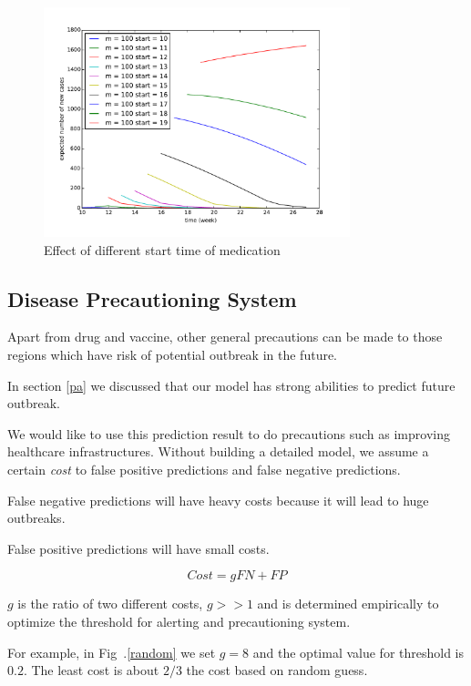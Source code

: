 \documentclass[11pt]{article}
\begin{document}
\begin{figure}[hbtp]
\begin{center}
  \includegraphics[width=3.5in]{graph/good4.pdf}
  \caption{Effect of different start time of medication}
  \label{g3}
\end{center}  
\end{figure}

 

\subsection{Disease Precautioning System}

Apart from drug and vaccine, other general precautions can be made to those regions which have risk of potential outbreak in the future. 

In section \ref{pa} we discussed that our model has strong abilities to predict future outbreak. 

We would like to use this prediction result to do precautions such as improving healthcare infrastructures. Without building a detailed model, we assume a certain \emph{cost} to false positive predictions and false negative predictions.

False negative predictions will have  heavy costs because it will lead to huge outbreaks.

False positive predictions will have small costs. 

$$Cost = g FN + FP$$

$g$ is the ratio of two different costs, $g >> 1$ and is determined empirically to optimize the threshold for alerting and precautioning system.

For example, in Fig~.\ref{random} we set $g = 8$ and the optimal value for threshold is $0.2$. The least cost is about $2/3$ the cost based on random guess.  
\end{document}
